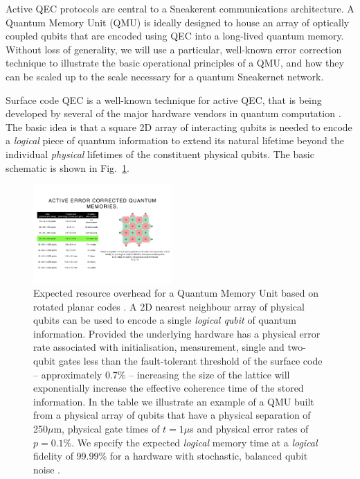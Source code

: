 \documentclass[twocolumn, aps, rmp, amsmath, amssymb, nofootinbib, superscriptaddress, longbibliography, floatfix, table-of-contents, eqsecnum]{revtex4-2}
\newcommand{\comment}[1]{{\color{blue}{\textbf{#1}}}}
\begin{document}
Active QEC protocols are central to a Sneakerent communications architecture. A Quantum Memory Unit (QMU) is ideally designed to house an array of optically coupled qubits that are encoded using QEC into a long-lived quantum memory. Without loss of generality, we will use a particular, well-known error correction technique to illustrate the basic operational principles of a QMU, and how they can be scaled up to the scale necessary for a quantum Sneakernet network.

\comment{Peter up to here}

Surface code QEC is a well-known technique for active QEC, that is being developed by several of the major hardware vendors in quantum computation \cite{SD-Fowler:2012aa}. The basic idea is that a square 2D array of interacting qubits is needed to encode a \textit{logical} piece of quantum information to extend its natural lifetime beyond the individual \textit{physical} lifetimes of the constituent physical qubits. The basic schematic is shown in Fig.~\ref{fig:array}. 

\begin{figure}[htbp!]
	\includegraphics[clip=true, width=0.475\textwidth]{array}
	\caption{Expected resource overhead for a Quantum Memory Unit based on rotated planar codes \cite{SD-Horsman:2012aa}.  A 2D nearest neighbour array of physical qubits can be used to encode a single {\em logical qubit} of quantum information.  Provided the underlying hardware has a physical error rate associated with initialisation, measurement, single and two-qubit gates less than the fault-tolerant threshold of the surface code -- approximately 0.7\% --  increasing the size of the lattice will exponentially increase the effective coherence time of the stored information.  In the table we illustrate an example of a QMU built from a physical array of qubits that have a physical separation of 250$\mu$m, physical gate times of $t=1\mu$s and physical error rates of $p=0.1\%$.  We specify the expected {\em logical} memory time at a {\em logical} fidelity of 99.99\% for a hardware with stochastic, balanced qubit noise \cite{SD-Devitt:2016aa}.} 
	\label{fig:array}
\end{figure}
\end{document}
